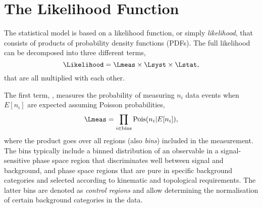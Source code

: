
\section{The Likelihood Function}
\label{sec:likelihood}
The statistical model is based on a likelihood function, or simply \emph{likelihood}, that consists of products of probability density functions (PDFs). The full likelihood can be decomposed into three different terms,
\begin{equation}
    \label{eq:likelihood-three-terms}
    \Likelihood = \Lmeas \times \Lsyst \times \Lstat,
\end{equation}
that are all multiplied with each other.

The first term, \Lmeas, measures the probability of measuring $n_i$ data events when $E[n_i]$ are expected assuming Poisson probabilities, 
\begin{equation}
    \Lmeas = \prod_{i \in \text{bins}} \text{Pois}(n_i | E[n_i] ),
\end{equation}
where the product goes over all regions (also \emph{bins}) included in the measurement. The bins typically include a binned distribution of an observable in a signal-sensitive phase space region that discriminates well between signal and background, and phase space regions that are pure in specific background categories and selected according to kinematic and topological requirements. The latter bins are denoted as \emph{control regions} and allow determining the normalisation of certain background categories in the data.


